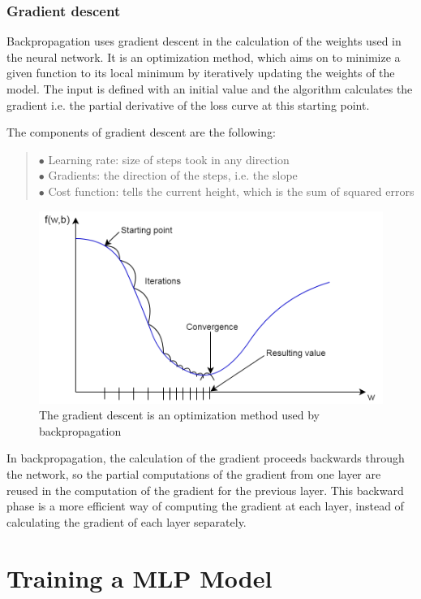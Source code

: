 \subsubsection{Gradient descent}

Backpropagation uses gradient descent in the calculation of the weights used in the neural network. It is an optimization method, which aims on to minimize a given function to its local minimum by iteratively updating the weights of the model. The input is defined with an initial value and the algorithm calculates the gradient i.e. the partial derivative of the loss curve at this starting point. \medskip

\noindent The components of gradient descent are the following:
\begin{verse}
	$\bullet$ Learning rate: size of steps took in any direction\\
	$\bullet$ Gradients: the direction of the steps, i.e. the slope\\
	$\bullet$ Cost function: tells the current height, which is the sum of squared errors
\end{verse}

\begin{figure}[h]
	\centering
	\includegraphics[height=0.35\linewidth]{./figures/gradient}
	\caption{The gradient descent is an optimization method used by backpropagation}
	\label{fig:gradient}
\end{figure}

In backpropagation, the calculation of the gradient proceeds backwards through the network, so the partial computations of the gradient from one layer are reused in the computation of the gradient for the previous layer. This backward phase is a more efficient way of computing the gradient at each layer, instead of calculating the gradient of each layer separately.



\section{Training a MLP Model}

